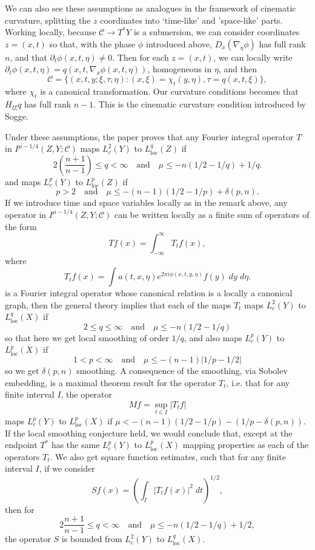 \begin{remark}
    We can also see these assumptions as analogues in the framework of cinematic curvature, splitting the $z$ coordinates into `time-like' and 'space-like' parts. Working locally, because $\mathcal{C} \to T^* Y$ is a submersion, we can consider coordinates $z = (x,t)$ so that, with the phase $\phi$ introduced above, $D_x (\nabla_\eta \phi)$ has full rank $n$, and that $\partial_t \phi(x,t,\eta) \neq 0$. Then for each $z = (x,t)$, we can locally write $\partial_t \phi(x,t,\eta) = q(x,t,\nabla_x \phi(x,t,\eta))$, homogeneous in $\eta$, and then
    \[ \mathcal{C} = \{ (x,t,y;\xi,\tau,\eta) : (x,\xi) = \chi_t(y,\eta), \tau = q(x,t,\xi) \}, \]
    where $\chi_t$ is a canonical transformation. Our curvature conditions becomes that $H_{\xi \xi} q$ has full rank $n-1$. This is the cinematic curvature condition introduced by Sogge. %
\end{remark}

Under these assumptions, the paper proves that any Fourier integral operator $T$ in $I^{\mu - 1/4}(Z,Y;\mathcal{C})$ maps $L^2_c(Y)$ to $L^q_{\text{loc}}(Z)$ if
%
\[ 2 \left( \frac{n+1}{n-1} \right) \leq q < \infty \quad\text{and}\quad \mu \leq - n (1/2 - 1/q) + 1/q. \]
%
and maps $L^p_c(Y)$ to $L^p_{\text{loc}}(Z)$ if
%
\[ p > 2 \quad\text{and}\quad \mu \leq -(n-1)(1/2 - 1/p) + \delta(p,n). \]
%
If we introduce time and space variables locally as in the remark above, any operator in $I^{\mu - 1/4}(Z,Y;\mathcal{C})$ can be written locally as a finite sum of operators of the form
%
\[ Tf(x) = \int_{-\infty}^\infty T_t f(x), \]
%
where
%
\[ T_t f(x) = \int a(t,x,\eta) e^{2 \pi i \phi(x,t,y,\eta)} f(y)\; dy\; d\eta. \]
%
is a Fourier integral operator whose canonical relation is a locally a canonical graph, then the general theory implies that each of the maps $T_t$ maps $L^2_c(Y)$ to $L^q_{\text{loc}}(X)$ if
%
\[ 2 \leq q \leq \infty \quad\text{and}\quad \mu \leq -n(1/2 - 1/q) \]
%
so that here we get local smoothing of order $1/q$, and also maps $L^p_c(Y)$ to $L^p_{\text{loc}}(X)$ if
%
\[ 1 < p < \infty \quad\text{and}\quad \mu \leq -(n-1)|1/p - 1/2| \]
%
so we get $\delta(p,n)$ smoothing. A consequence of the smoothing, via Sobolev embedding, is a maximal theorem result for the operator $T_t$, i.e. that for any finite interval $I$, the operator
%
\[ Mf = \sup_{t \in I} |T_t f| \]
%
maps $L^p_c(Y)$ to $L^p_{\text{loc}}(X)$ if $\mu < -(n-1)(1/2 - 1/p) - (1/p - \delta(p,n))$. If the local smoothing conjecture held, we would conclude that, except at the endpoint $T^*$ has the same $L^p_c(Y)$ to $L^p_{\text{loc}}(X)$ mapping properties as each of the operators $T_t$. We also get square function estimates, such that for any finite interval $I$, if we consider
%
\[ Sf(x) = \left( \int_I |T_t f(x)|^2\; dt \right)^{1/2}, \]
%
then for
%
\[ 2 \frac{n+1}{n-1} \leq q < \infty \quad\text{and}\quad \mu \leq -n(1/2 - 1/q) + 1/2, \]
%
the operator $S$ is bounded from $L^2_c(Y)$ to $L^q_{\text{loc}}(X)$.

